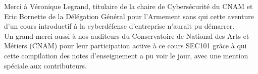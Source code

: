 

\newpage

\thispagestyle{empty}

\begin{center}


\large{Merci à Véronique Legrand, titulaire de la chaire de Cybersécurité du CNAM et Eric Bornette de la Délégation Général pour l'Armement sans qui cette aventure d'un cours introductif à la cyberdéfense d'entreprise n'aurait pu démarrer. 
\\ 
Un grand merci aussi à nos auditeurs du Conservatoire de National des Arts et Métiers (CNAM) pour leur participation active à ce cours SEC101 grâce à qui cette compilation des notes d'enseignement a  pu voir le jour, avec une mention spéciale aux contributeurs. 
}



\end{center}




\clearpage 


